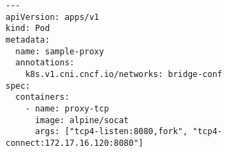 \begin{lstfloat}
\begin{lstlisting}[style=mybashstyle,
caption={Ukázka konfigurace podu s Proxy},
label={sample:proxy}
]
---
apiVersion: apps/v1
kind: Pod
metadata:
  name: sample-proxy
  annotations:
    k8s.v1.cni.cncf.io/networks: bridge-conf
spec:
  containers:
    - name: proxy-tcp
      image: alpine/socat
      args: ["tcp4-listen:8080,fork", "tcp4-connect:172.17.16.120:8080"]
\end{lstlisting}
\end{lstfloat}
